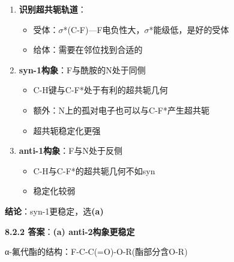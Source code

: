 \documentclass[a4paper,11pt]{ctexart}
\providecommand{\tightlist}{\setlength{\itemsep}{0pt}\setlength{\parskip}{0pt}}
\newcommand{\箭}{\ensuremath{\rightarrow}}
\newcommand{\左箭}{\ensuremath{\leftarrow}}
\newcommand{\上箭}{\ensuremath{\uparrow}}
\newcommand{\下箭}{\ensuremath{\downarrow}}
\newcommand{\衡}{\ensuremath{\rightleftharpoons}}
\newcommand{\双箭}{\ensuremath{\leftrightarrow}}
\newcommand{\约等于}{\ensuremath{\approx}}
\newcommand{\小于等于}{\ensuremath{\leq}}
\newcommand{\大于等于}{\ensuremath{\geq}}
\newcommand{\不等于}{\ensuremath{\neq}}
\newcommand{\西格马}{\ensuremath{\sigma}}
\newcommand{\派}{\ensuremath{\pi}}
\begin{document}
\begin{enumerate}
\def\labelenumi{\arabic{enumi}.}
\tightlist
\item
  \textbf{识别超共轭轨道}：

  \begin{itemize}
  \tightlist
  \item
    受体：\西格马*(C-F)---F电负性大，\西格马*能级低，是好的受体
  \item
    给体：需要在邻位找到合适的
  \end{itemize}
\item
  \textbf{syn-1构象}：F与酰胺的N处于同侧

  \begin{itemize}
  \tightlist
  \item
    C-H键与C-F*处于有利的超共轭几何
  \item
    额外：N上的孤对电子也可以与C-F*产生超共轭
  \item
    超共轭稳定化更强
  \end{itemize}
\item
  \textbf{anti-1构象}：F与N处于反侧

  \begin{itemize}
  \tightlist
  \item
    C-H与C-F*的超共轭几何不如syn
  \item
    稳定化较弱
  \end{itemize}
\end{enumerate}

\textbf{结论}：syn-1更稳定，选\textbf{(a)}

\textbf{8.2.2 答案}：\textbf{(a) anti-2构象更稳定}

α-氟代酯的结构：F-C-C(=O)-O-R(酯部分含O-R)
\end{document}
